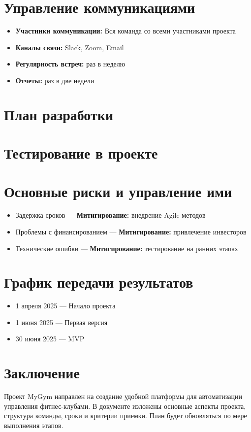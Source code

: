 \documentclass[14pt, russian]{matmex-diploma-custom}
\begin{document}
\section{Управление коммуникациями}
\begin{itemize}
\item \textbf{Участники коммуникации:} Вся команда со всеми участниками проекта
\item \textbf{Каналы связи:} Slack, Zoom, Email
\item \textbf{Регулярность встреч:} раз в неделю
\item \textbf{Отчеты:} раз в две недели
\end{itemize}

\section{План разработки}

\section{Тестирование в проекте}

\section{Основные риски и управление ими}
\begin{itemize}
\item Задержка сроков --- \textbf{Митигирование:} внедрение Agile-методов
\item Проблемы с финансированием --- \textbf{Митигирование:} привлечение инвесторов
\item Технические ошибки --- \textbf{Митигирование:} тестирование на ранних этапах
\end{itemize}

\section{График передачи результатов}
\begin{itemize}
\item 1 апреля 2025 --- Начало проекта
\item 1 июня 2025 --- Первая версия
\item 30 июня 2025 --- MVP
\end{itemize}


\section{Заключение}
Проект MyGym направлен на создание удобной платформы для автоматизации управления фитнес-клубами. В документе изложены основные аспекты проекта, структура команды, сроки и критерии приемки. План будет обновляться по мере выполнения этапов.
\end{document}
